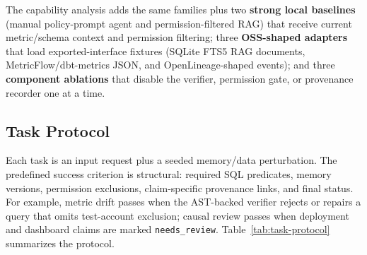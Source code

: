\documentclass[10pt]{article}
\newcommand{\code}[1]{\texttt{#1}}
\begin{document}
The capability analysis adds the same families plus two \textbf{strong local baselines} (manual policy-prompt agent and permission-filtered RAG) that receive current metric/schema context and permission filtering; three \textbf{OSS-shaped adapters} that load exported-interface fixtures (SQLite FTS5 RAG documents, MetricFlow/dbt-metrics JSON, and OpenLineage-shaped events); and three \textbf{component ablations} that disable the verifier, permission gate, or provenance recorder one at a time.

\subsection{Task Protocol}
Each task is an input request plus a seeded memory/data perturbation. The predefined success criterion is structural: required SQL predicates, memory versions, permission exclusions, claim-specific provenance links, and final status. For example, metric drift passes when the AST-backed verifier rejects or repairs a query that omits test-account exclusion; causal review passes when deployment and dashboard claims are marked \code{needs\_review}. Table~\ref{tab:task-protocol} summarizes the protocol.
\end{document}
